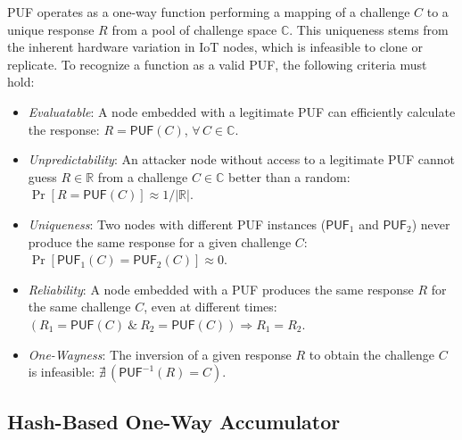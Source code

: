\documentclass[conference]{IEEEtran}
\begin{document}
PUF operates as a one-way function performing a mapping of a challenge $C$
to a unique response $R$ from a pool of challenge space $\mathbb{C}$.
This uniqueness stems from the inherent hardware variation in IoT nodes,
which is infeasible to clone or replicate.
To recognize a function as a valid PUF, the following criteria must hold:
\begin{itemize}
  \item \emph{Evaluatable}: A node embedded with a legitimate PUF can
    efficiently calculate the response: $R = \mathsf{PUF}(C)$,
    $\forall\, C \in \mathbb{C}$.
  \item \emph{Unpredictability}: An attacker node without access to a
    legitimate PUF cannot guess $R \in \mathbb{R}$ from a challenge
    $C \in \mathbb{C}$ better than a random:
    $\Pr[R = \mathsf{PUF}(C)] \approx 1/|\mathbb{R}|$.
  \item \emph{Uniqueness}: Two nodes with different PUF instances
    ($\mathsf{PUF}_1$ and $\mathsf{PUF}_2$) never produce the same
    response for a given challenge $C$:
    $\Pr[\mathsf{PUF}_1(C) = \mathsf{PUF}_2(C)] \approx 0$.
  \item \emph{Reliability}: A node embedded with a PUF produces the same
    response $R$ for the same challenge $C$, even at different times:
    $(R_1 = \mathsf{PUF}(C)\ \&\ R_2 = \mathsf{PUF}(C)) \Rightarrow R_1 = R_2$.
  \item \emph{One-Wayness}: The inversion of a given response $R$ to obtain
    the challenge $C$ is infeasible:
    $\nexists\,(\mathsf{PUF}^{-1}(R) = C)$.
\end{itemize}

\subsection{Hash-Based One-Way Accumulator}
\end{document}
